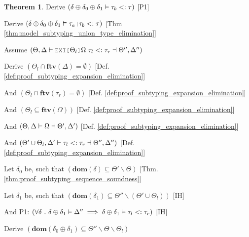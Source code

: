 \documentclass[acmsmall]{acmart}
\theoremstyle{definition}
\newtheorem{theorem}{Theorem}[section]
\begin{document}
\begin{theorem}
  \item \I\I \N Derive $(
    \delta \oplus \delta_0 \oplus \delta_1 \vDash \tau_b <: \tau
  )$ [P1]

  \item \I\I \N Derive $(
    \delta \oplus \delta_0 \oplus \delta_1 \satisfies \tau_a \J{|} \tau_b \subtypes \tau
  )$ [Thm \ref{thm:model_subtyping_union_type_elimination}]



  \item \N Assume $(
    \Theta, \Delta \entails
    \J{EXI[}\Theta_l\J{]}\Omega\ \tau_l \subtypes \tau_r
    \given \Theta'', \Delta'' 
  )$

  \item \I \N Derive $(
    \Theta_l \cap \textbf{ftv}(\Delta) = \emptyset 
  )$ [Def. \ref{def:proof_subtyping_expansion_elimination}]
  \item \I \N And $(
    \Theta_l \cap \textbf{ftv}(\tau_r) = \emptyset
  )$ [Def. \ref{def:proof_subtyping_expansion_elimination}]
  \item \I \N And $(
    \Theta_l \subseteq \textbf{ftv}(\Omega)
  )$ [Def. \ref{def:proof_subtyping_expansion_elimination}]
  \item \I \N And $(
    \Theta, \Delta \vdash \Omega \dashv \Theta', \Delta'
  )$ [Def. \ref{def:proof_subtyping_expansion_elimination}]
  \item \I \N And $(
    \Theta' \cup \Theta_l, \Delta' \vdash
    \tau_l <: \tau_r \dashv \Theta'', \Delta''
  )$ [Def. \ref{def:proof_subtyping_expansion_elimination}]


  \item \I \N Let $\delta_0$ be, such that $(
    \textbf{dom}(\delta) \subseteq \Theta' \backslash \Theta
  )$ [Thm. \ref{thm:proof_subtyping_sequence_soundness}]

  \item \I \N Let $\delta_1$ be, such that $(
    \textbf{dom}(\delta_1) \subseteq \Theta'' \backslash (\Theta' \cup \Theta_l)
  )$ [IH]


  \item \I \N And P1: $(
    \forall \delta \ .\ 
    \delta \oplus \delta_1 \vDash \Delta''
    \implies
    \delta \oplus \delta_1 \vDash \tau_l <: \tau_r
  )$ [IH]

  \item \I \N Derive $(
    \textbf{dom}(\delta_0 \oplus \delta_1) \subseteq \Theta'' \backslash \Theta \backslash \Theta_l
  )$


\end{theorem}
\end{document}
